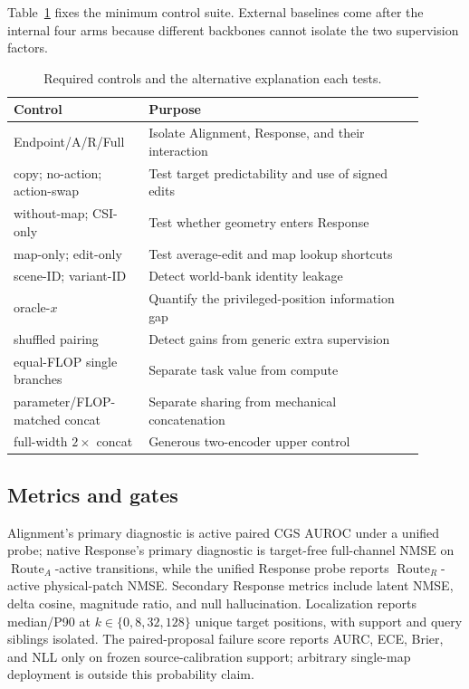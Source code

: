 \documentclass{article}
\newcommand{\route}{\operatorname{Route}}
\begin{document}
Table~\ref{tab:controls} fixes the minimum control suite.  External baselines
come after the internal four arms because different backbones cannot isolate
the two supervision factors.

\begin{table}[t]
\caption{Required controls and the alternative explanation each tests.}
\label{tab:controls}
\centering
\small
\begin{tabular}{p{0.29\linewidth}p{0.61\linewidth}}
\toprule
Control & Purpose \\
\midrule
Endpoint/A/R/Full & Isolate Alignment, Response, and their interaction \\
copy; no-action; action-swap & Test target predictability and use of signed edits \\
without-map; CSI-only & Test whether geometry enters Response \\
map-only; edit-only & Test average-edit and map lookup shortcuts \\
scene-ID; variant-ID & Detect world-bank identity leakage \\
oracle-$x$ & Quantify the privileged-position information gap \\
shuffled pairing & Detect gains from generic extra supervision \\
equal-FLOP single branches & Separate task value from compute \\
parameter/FLOP-matched \mbox{concat} & Separate sharing from mechanical concatenation \\
full-width $2\times$ concat & Generous two-encoder upper control \\
\bottomrule
\end{tabular}
\end{table}

\subsection{Metrics and gates}

Alignment's primary diagnostic is active paired CGS AUROC under a unified
probe; native Response's primary diagnostic is target-free full-channel NMSE on
$\route_A$-active transitions, while the unified Response probe reports
$\route_R$-active physical-patch NMSE.  Secondary Response metrics include latent NMSE, delta
cosine, magnitude ratio, and null hallucination.  Localization reports
median/P90 at $k\in\{0,8,32,128\}$ unique target positions, with support and
query siblings isolated.  The paired-proposal failure score reports AURC,
ECE, Brier, and NLL only on frozen source-calibration support; arbitrary
single-map deployment is outside this probability claim.
\end{document}
